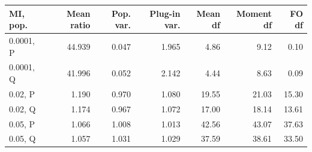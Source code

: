 \begin{tabular}{@{}lrrrrrr@{}}
\toprule
MI, pop. & Mean ratio & Pop. var. & Plug-in var. & Mean df & Moment df & FO df\\
\midrule
0.0001, P & 44.939 & 0.047 & 1.965 & 4.86 & 9.12 & 0.10\\
0.0001, Q & 41.996 & 0.052 & 2.142 & 4.44 & 8.63 & 0.09\\
0.02, P & 1.190 & 0.970 & 1.080 & 19.55 & 21.03 & 15.30\\
0.02, Q & 1.174 & 0.967 & 1.072 & 17.00 & 18.14 & 13.61\\
0.05, P & 1.066 & 1.008 & 1.013 & 42.56 & 43.07 & 37.63\\
0.05, Q & 1.057 & 1.031 & 1.029 & 37.59 & 38.61 & 33.50\\
\bottomrule
\end{tabular}
